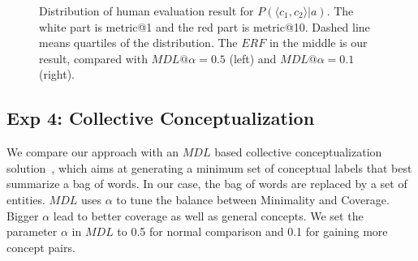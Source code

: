 %
%
\begin{figure}[!b]
\vspace{-2mm}
\centering
\footnotesize
{}
\vspace{-8mm}
\caption{\small Distribution of human evaluation result for $P(\langle c_1,c_2 \rangle|a)$. \footnotesize The white part is metric@1 and the red part is metric@10. Dashed line means quartiles of the distribution. The $ERF$ in the middle is our result, compared with $MDL@\alpha=0.5$ (left) and $MDL@\alpha=0.1$(right). }
\label{fig:eva_violin_pc1c2ga}
\vspace{-4mm}
\end{figure}

%
%

\subsection{Exp 4: Collective Conceptualization}
We compare our approach with an $MDL$ based collective conceptualization solution~\cite{sunconceptual}, which aims at generating a minimum set of conceptual labels that best summarize a bag of words.
In our case, the bag of words are replaced by a set of entities.
$MDL$ uses $\alpha$ to tune the balance between \ac{Minimality} and \ac{Coverage}. 
Bigger $\alpha$ lead to better coverage as well as general concepts.
We set the parameter $\alpha$ in $MDL$ to 0.5 for normal comparison and 0.1 for gaining more concept pairs.

